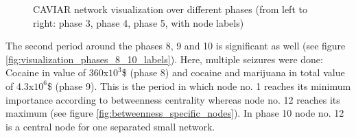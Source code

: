 \begin{figure}[htbp]
\begin{minipage}{.32\textwidth}
	\end{minipage}
	\caption{CAVIAR network visualization over different phases (from left to right: phase 3, phase 4, phase 5, with node labels)}
\label{fig:visualization_phases_3_5_labels}
\end{figure}

The second period around the phases 8, 9 and 10 is significant as well (see figure \ref{fig:visualization_phases_8_10_labels}). Here, multiple seizures were done: Cocaine in value of 360x$10^3$\$ (phase 8) and cocaine and marijuana in total value of 4.3x$10^6$\$ (phase 9). This is the period in which node no. 1 reaches its minimum importance according to betweenness centrality whereas node no. 12 reaches its maximum (see figure \ref{fig:betweenness_specific_nodes}). In phase 10 node no. 12 is a central node for one separated small network.\\

